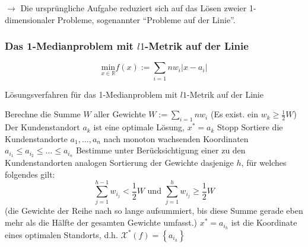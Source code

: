       $\rightarrow$ Die ursprüngliche Aufgabe reduziert sich auf das Lösen zweier 1-dimensionaler Probleme, sogenannter ``Probleme auf der Linie''.

      \subsubsection{Das 1-Medianproblem mit $l1$-Metrik auf der Linie} %
      \label{ssub:das_1_medianproblem_mit_metrik_auf_der_linie}
      
      \[\underset{x \in \mathbb{R}}{\text{min}} f(x) := \sum_{i= 1}{n}w_i\left|x - a_i\right|\]

      \begin{algorithm}[H]
        \caption{Lösungsverfahren für das 1-Medianproblem mit $l1$-Metrik auf der Linie}
        \begin{algorithmic}[1]
          \State Berechne die Summe $W$ aller Gewichte $W:=\sum_{i= 1}{n}w_i$
          \If (Es exist. ein $w_k \geq \frac{1}{2}W$)
            \State Der Kundenstandort $a_k$ ist eine optimale Lösung, $x^* = a_k$
            \State Stopp
          \Else
            \State Sortiere die Kundenstandorte $a_1, \dots, a_n$ nach monoton wachsenden Koordinaten $a_{i_1} \leq a_{i_2} \leq \dots \leq a_{i_n}$
            \State Bestimme unter Berücksichtigung einer zu den Kundenstandorten analogen Sortierung der Gewichte dasjenige $h$, für welches folgendes gilt:
            \[\sum_{j=1}^{h-1}w_{i_j} < \frac{1}{2}W \text{ und } \sum_{j=1}^{h}w_{i_j} \geq \frac{1}{2}W\] (die Gewichte der Reihe nach so lange aufsummiert, bis diese Summe gerade eben mehr als die Hälfte der gesamten Gewichte umfasst.)
            \State $x^* = a_{i_h}$ ist die Koordinate eines optimalen Standorts, d.h. $\mathcal{X}^*(f) = \left\{a_{i_h}\right\}$
          \EndIf
        \end{algorithmic}
      \end{algorithm}

      \begin{exmp}
        
      \end{exmp}

